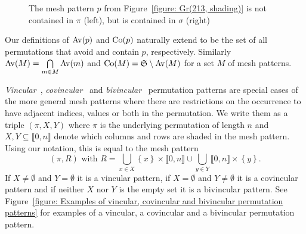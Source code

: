\begin{example}
\begin{figure}[htbp]
    \caption{The mesh pattern $p$ from Figure~\ref{figure: Gr(213, shading)} is 
    not contained in $\pi$ (left), but is contained in $\sigma$ (right)}
    \label{figure:p not in pi and p in sigma}
  \end{figure}
\end{example}

Our definitions of ${\mathrm{Av}\!\left(p\right)}$ and ${\mathrm{Co}\!\left(p\right)}$ naturally extend to be the set of all 
permutations that avoid and contain $p$, respectively. Similarly ${\mathrm{Av}\!\left(M\right)} = 
\bigcap\limits_{m \in M}{\mathrm{Av}\!\left(m\right)}$ and ${\mathrm{Co}\!\left(M\right)} = \mathfrak{S} \setminus {\mathrm{Av}\!\left(M\right)}$ for a set $M$ 
of mesh patterns.

\emph{Vincular}~\cite{babson_generalized_2000}, \emph{covincular}~\cite{
bean_enumerations_2017} and \emph{bivincular}~\cite{bousquet-melou_2+2-free_2010}
permutation patterns are special cases of the more general mesh patterns where 
there are restrictions on the occurrence to have adjacent indices, values or both
in the permutation. We write them as a triple $(\pi, X, Y)$ where $\pi$ is the
underlying permutation of length $n$ and $X,Y \subseteq \llbracket 0, n \rrbracket$
denote which columns and rows are shaded in the mesh pattern. Using our notation, 
this is equal to the mesh pattern \[ (\pi, R) \text{ with } R = \bigcup_{ x \in X }
{ \left\{ x \right\} \times \llbracket 0, n \rrbracket } \cup \bigcup_{ y \in Y }
{ \llbracket 0, n \rrbracket \times \left\{ y \right\} } .\] If $X \neq \emptyset$ 
and $Y = \emptyset$ it is a vincular pattern, if $X = \emptyset$ and $Y \neq \emptyset$
it is a covincular pattern and if neither $X$ nor $Y$ is the empty set it is a
bivincular pattern. See Figure~\ref{figure: Examples of vincular, covincular
and bivincular permutation patterns} for examples of a vincular, a covincular
and a bivincular permutation pattern.

